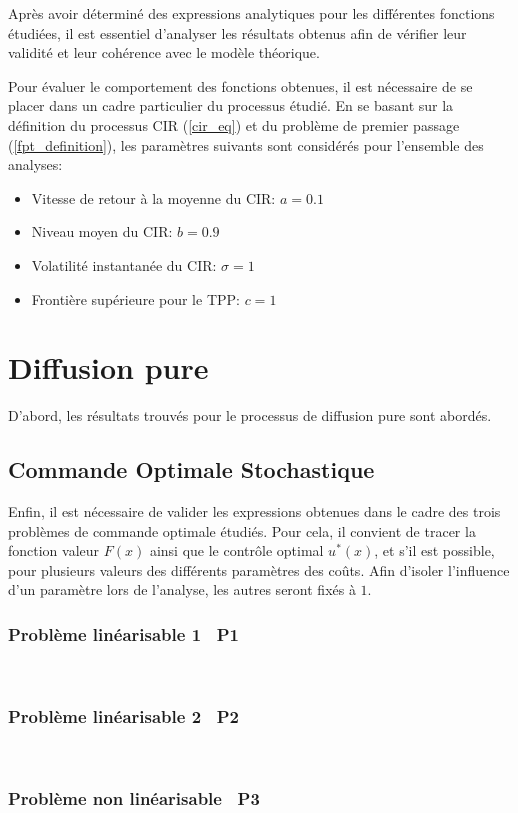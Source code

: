 \label{sec:Theme2}

Après avoir déterminé des expressions analytiques pour les différentes fonctions étudiées, il est essentiel d'analyser les résultats obtenus afin de vérifier leur validité et leur cohérence avec le modèle théorique. 

Pour évaluer le comportement des fonctions obtenues, il est nécessaire de se placer dans un cadre particulier du processus étudié. En se basant sur la définition du processus \acs{CIR} (\ref{cir_eq}) et du problème de premier passage (\ref{fpt_definition}), les paramètres suivants sont considérés pour l'ensemble des analyses:

\begin{itemize}
    \item Vitesse de retour à la moyenne du \acs{CIR}: $a=0.1$
    \item Niveau moyen du \acs{CIR}: $b=0.9$
    \item Volatilité instantanée du \acs{CIR}: $\sigma=1$
    \item Frontière supérieure pour le \acs{TPP}: $c=1$
\end{itemize}

\section{Diffusion pure}

D'abord, les résultats trouvés pour le processus de diffusion pure sont abordés.

\subsection{Commande Optimale Stochastique}

Enfin, il est nécessaire de valider les expressions obtenues dans le cadre des trois problèmes de commande optimale étudiés. Pour cela, il convient de tracer la fonction valeur $F(x)$ ainsi que le contrôle optimal $u^*(x)$, et s'il est possible, pour plusieurs valeurs des différents paramètres des coûts. Afin d'isoler l'influence d'un paramètre lors de l'analyse, les autres seront fixés à $1$.

\subsubsection{Problème linéarisable 1 \textemdash~P1}\phantom{}\\

\FloatBarrier\subsubsection{Problème linéarisable 2 \textemdash~P2}\phantom{}\\

\subsubsection{Problème non linéarisable \textemdash~P3}\phantom{}\\
